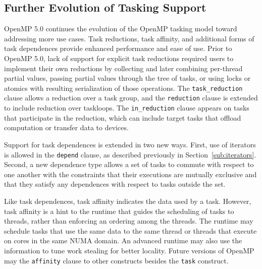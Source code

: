 \subsection{Further Evolution of Tasking Support}
\label{sub:new_tasking}

OpenMP 5.0 continues the evolution of the OpenMP tasking model toward 
addressing more use cases.  Task reductions, task affinity, and 
additional forms of task dependences provide enhanced performance and 
ease of use.  Prior to OpenMP 5.0, lack of support for explicit task 
reductions required users to implement their own reductions by 
collecting and later combining per-thread partial values, passing 
partial values through the tree of tasks, or using locks or atomics 
with resulting serialization of those operations.  The 
\texttt{task\_reduction} clause allows a reduction over a task group, 
and the \texttt{reduction} clause is extended to include reduction 
over taskloops.  The \texttt{in\_reduction} clause appears on tasks that 
participate in the reduction, which can include target tasks that 
offload computation or transfer data to devices.

Support for task dependences is extended in two new ways.  First, use 
of iterators is allowed in the \texttt{depend} clause, as described 
previously in Section~\ref{sub:iterators}. Second, a new dependence type 
allows a set of tasks to commute with respect to one another with the 
constraints that their executions are mutually exclusive and that 
they satisfy any dependences with respect to tasks outside the set.

Like task dependences, task affinity indicates the data used by a task. 
However, task affinity is a hint to the runtime that guides the scheduling 
of tasks to threads, rather than enforcing an ordering among the threads. 
The runtime may schedule tasks that use the same data to the same thread 
or threads that execute on cores in the same NUMA  domain. An advanced 
runtime may also use the information to tune work stealing for better 
locality. Future versions of OpenMP may the \texttt{affinity} clause to
other constructs besides the \texttt{task} construct.

